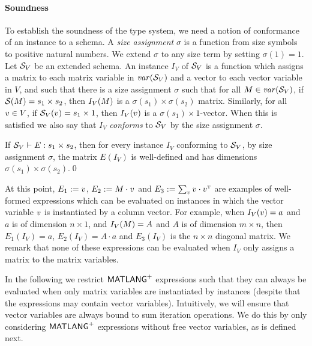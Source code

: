 \paragraph{Soundness}
To establish the soundness of the type system,
we need a notion of conformance of an instance to a schema. A \emph{size assignment} $\sigma$ is a function
from size symbols to positive natural numbers.  We extend
$\sigma$ to any size term by setting $\sigma(1) = 1$.  
Let $\mathcal{S}_V$ be an extended schema. An instance $I_V$ of $\mathcal{S}_V$ is a
function which assigns a matrix to each matrix variable in $\operatorname{\mathit{var}}(\mathcal{S}_V)$ and a vector to each vector variable in $V$,
and such that there is a size assignment $\sigma$ such
that for all $M \in \operatorname{\mathit{var}}(\mathcal{S}_V)$, if $\mathcal{S}(M) = s_1 \times s_2$,
then $I_V(M)$ is a $\sigma(s_1) \times \sigma(s_2)$ matrix.  Similarly,
for all $v\in V$, if $\mathcal{S}_V(v)=s_1\times 1$, then $I_V(v)$ is a
$\sigma(s_1)\times 1$-vector. When this is satisfied we  also say that $I_V$
\emph{conforms} to $\mathcal{S}_V$ by the size assignment $\sigma$.

\begin{proposition}[Safety]
If $\mathcal{S}_V \vdash E : s_1 \times s_2$, then for every instance $I_V$
conforming to $\mathcal{S}_V$, by size assignment $\sigma$, the
matrix $E(I_V)$ is well-defined and has dimensions
$\sigma(s_1) \times \sigma(s_2)$.\qed
\end{proposition}

\begin{example}
At this point, $E_1:=v$,  $E_2:=M\cdot v$ and $E_3:=\sum_{v} v\cdot v^{\textsc{t}}$ are examples of well-formed expressions
which can be evaluated on instances in which the vector variable $v$ is instantiated by a column vector. For example,
when $I_V(v)=a$ and $a$ is of dimension $n\times 1$, and $I_V(M)=A$ and $A$ is of dimension $m\times n$, then
$E_1(I_V)=a$, $E_2(I_V)=A\cdot a$ and $E_3(I_V)$ is the $n\times n$ diagonal matrix. We remark that none of these expressions can be evaluated when $I_V$ only assigns a matrix to
the matrix variables.
\end{example}


In the following we restrict $\mathsf{MATLANG}^{\sf +}$ expressions such that they can always be evaluated
when only matrix variables are instantiated by instances (despite that the expressions may contain vector variables). Intuitively, we will 
ensure that vector variables are always bound to sum iteration operations. We do this by only considering $\mathsf{MATLANG}^{\sf +}$ expressions 
without free vector variables, as is defined next.

